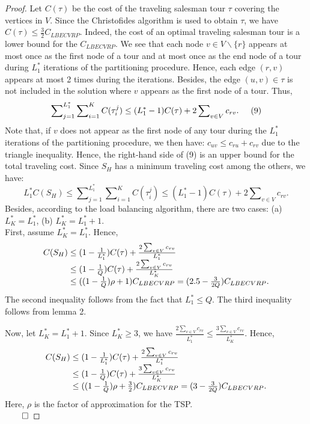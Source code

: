 \begin{proof}
Let $C(\tau)$ be the cost of the traveling salesman tour $\tau$ covering the vertices in $V$. Since the Christofides algorithm is used to obtain $\tau$, we have $C(\tau ) \le \frac{3}{2} C_{LBECVRP}$. Indeed, the cost of an optimal traveling salesman tour is a lower bound for the $C_{LBECVRP}$. We see that each node $v\in V \backslash \{r\}$ appears at most once as the first node of a tour and at most once as the end node of a tour during $L_1^*$ iterations of the partitioning procedure. Hence, each edge $(r,v)$ appears at most 2 times during the iterations. Besides, the edge $(u,v) \in \tau$ is not included in the solution where $v$ appears as the first node of a tour. Thus,
$$\sum\nolimits_{j=1}^{L^*_1}\sum\nolimits_{i = 1}^{K} {C({\tau^j_i})}  \le (L_1^*-1)C(\tau ) + 2\sum\nolimits_{v \in V} c_{rv}. \hspace{0.5 cm} (9)$$
\noindent Note that, if $v$ does not appear as the first node of any tour during the $L_1^*$ iterations of the partitioning procedure, we then have: $c_{uv} \le c_{ru}+c_{rv}$ due to the triangle inequality. Hence, the right-hand side of (9) is an upper bound for the total traveling cost. Since $S_H$ has a minimum traveling cost among the others, we have:
$$L_1^* C(S_H)\le\sum\nolimits_{j=1}^{L^*_1}\sum\nolimits_{i = 1}^{K} {C({\tau^j_i})}  \le (L_1^*-1)C(\tau ) + 2\sum\nolimits_{v \in V} c_{rv}. $$
\noindent Besides, according to the load balancing algorithm, there are two cases: (a) $L_K^*=L_1^*$, (b) $L_K^*=L_1^*+1$.\\
\indent  First, assume $L_K^*=L_1^*$. Hence,
$$\begin{array}{l}
C(S_H) \le  (1-\frac{1}{L^*_1})C(\tau ) + \frac{2\sum\nolimits_{v \in V} c_{rv}}{L_1^*} \\
\hspace{1.13cm}\le  (1-\frac{1}{Q})C(\tau ) + \frac{2\sum\nolimits_{v \in V} c_{rv}}{L_K^*} \\
\hspace{1.13cm}\le  ((1-\frac{1}{Q})\rho  + 1){C_{LBECVRP}} = (2.5-\frac{3}{2Q}) C_{LBECVRP}.
\end{array}$$
\noindent The second inequality follows from the fact that $L_1^* \le Q$. The third inequality follows from lemma 2. 

\indent Now, let $L_K^*=L_1^*+1$. Since $L^*_K \ge 3$, we have $\frac{2\sum\nolimits_{v \in V} c_{rv}}{L_1^*}\le \frac{3\sum\nolimits_{v \in V} c_{rv}}{L_K^*}$. Hence,
$$\begin{array}{l}
C(S_H) \le  (1-\frac{1}{L^*_1})C(\tau ) + \frac{2\sum\nolimits_{v \in V} c_{rv}}{L_1^*} \\
\hspace{1.13cm}\le  (1-\frac{1}{Q})C(\tau ) + \frac{3\sum\nolimits_{v \in V} c_{rv}}{L_K^*} \\
\hspace{1.13cm}\le  ((1-\frac{1}{Q})\rho  + \frac{3}{2}){C_{LBECVRP}} = (3-\frac{3}{2Q}) C_{LBECVRP}.
\end{array}$$
\noindent Here, $\rho$ is the factor of approximation for the TSP.\\
 $\qed$
\end{proof}
